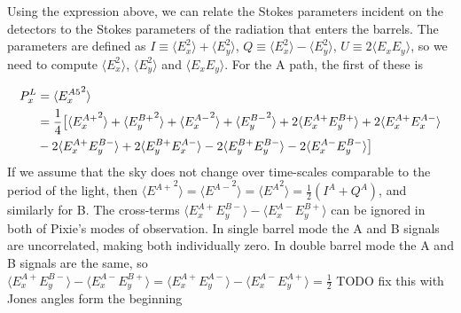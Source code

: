 \documentclass{article}
\begin{document}
Using the expression above, we can relate the
Stokes parameters incident on the detectors to the Stokes parameters
of the radiation that enters the barrels. The parameters are defined
as $I \equiv \langle E_x^2\rangle + \langle E_y^2\rangle$,
$Q \equiv \langle E_x^2\rangle - \langle E_y^2\rangle$,
$U \equiv 2\langle E_xE_y\rangle$, so we need to compute $\langle E_x^2\rangle$,
$\langle E_y^2\rangle$ and $\langle E_xE_y\rangle$. For the A path, the first of these is

\begin{align}
	P^L_x &= \langle {E^{A5}_x}^2\rangle \notag \\
		&= \frac14\big[
			\langle {E^{A+}_x}^2\rangle
			+ \langle {E^{B+}_y}^2\rangle
			+ \langle {E^{A-}_x}^2\rangle
			+ \langle {E^{B-}_y}^2\rangle
			+ 2\langle E^{A+}_xE^{B+}_y\rangle
			+ 2\langle E^{A+}_xE^{A-}_x\rangle \notag \\
			&- 2\langle E^{A+}_xE^{B-}_y\rangle
			+ 2\langle E^{B+}_yE^{A-}_x\rangle
			- 2\langle E^{B+}_yE^{B-}_y\rangle
			- 2\langle E^{A-}_xE^{B-}_y\rangle
			\big]
\end{align}
If we assume that the sky does not change over time-scales
comparable to the period of the light, then $\langle {E^{A+}}^2\rangle
= \langle {E^{A-}}^2\rangle = \langle {E^A}^2\rangle = \frac12(I^A+Q^A)$,
and similarly for B. The cross-terms $\langle E^{A+}_xE^{B-}_y\rangle
-\langle E^{A-}_xE^{B+}_y\rangle$ can be ignored in both of Pixie's modes of
observation. In single barrel mode the A and B signals are uncorrelated,
making both individually zero. In double barrel mode the A and B signals are
the same, so $\langle E^{A+}_xE^{B-}_y\rangle
-\langle E^{A-}_xE^{B+}_y\rangle = \langle E^{A+}_xE^{A-}_y\rangle
-\langle E^{A-}_xE^{A+}_y\rangle = \frac12$ TODO fix this with
Jones angles form the beginning
\end{document}
